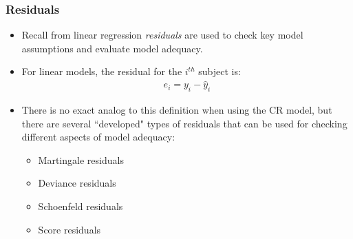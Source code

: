 \begin{frame}
\frametitle{Residuals}
\begin{itemize}
\item Recall from linear regression \textit{residuals} are used to check key model assumptions and evaluate model adequacy.
\item For linear models, the residual for the $i^{th}$ subject is:
\begin{eqnarray}
e_i=y_i-\hat{y}_i\nonumber
\end{eqnarray}
\item There is no exact analog to this definition when using the CR model, but there are several ``developed" types of residuals that can be used for checking different aspects of model adequacy:
\begin{itemize}
\item Martingale residuals %
\item Deviance residuals %
\item Schoenfeld residuals %
\item Score residuals %
\end{itemize}
\end{itemize}
\end{frame}


